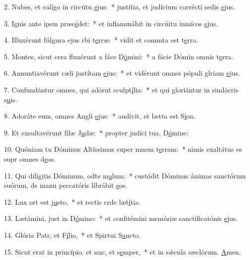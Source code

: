2. Nubes, et calígo in circútu \uline{e}jus:~* justítia, et judícium corrécti sedis \uline{e}jus.\par 
3. Ignis ante ipsm præc\uline{é}det:~* et inflammábit in circúitu inmícos \uline{e}jus.\par 
4. Illuxérunt fúlgura ejus rbi t\uline{e}rræ:~* vidit et commta est t\uline{e}rra.\par 
5. Montes, sicut cera fluxérunt a fáce D\uline{ó}mini:~* a fácie Dómin omnis t\uline{e}rra.\par 
6. Annuntiavérunt cæli justítam \uline{e}jus:~* et vidérunt omnes pópuli glriam \uline{e}jus.\par 
7. Confundántur omnes, qui adórnt sculpt\uline{í}lia:~* et qui gloriántur in simlácris s\uline{u}is.\par 
8. Adoráte eum, omnes Angli \uline{e}jus:~* audívit, et lætta est S\uline{i}on.\par 
9. Et exsultavérunt fílæ J\uline{u}dæ:~* propter judíci tua, D\uline{ó}mine:\par 
10. Quóniam tu Dóminus Altíssimus super mnem t\uline{e}rram:~* nimis exaltátus es supr omnes d\uline{e}os.\par 
11. Qui dilígitis Dóminum, odte m\uline{a}lum:~* custódit Dóminus ánimas sanctórum suórum, de manu peccatóris librábit \uline{e}os.\par 
12. Lux ort est j\uline{u}sto,~* et rectis crde læt\uline{í}tia.\par 
13. Lætámini, just in D\uline{ó}mino:~* et confitémini memóriæ sanctificatónis \uline{e}jus.\par 
14. Glória Patr, et F\uline{í}lio,~* et Spirtui S\uline{a}ncto.\par 
15. Sicut erat in princípio, et nnc, et s\uline{e}mper,~* et in sǽcula sæclórum. \uline{A}men.\par 
